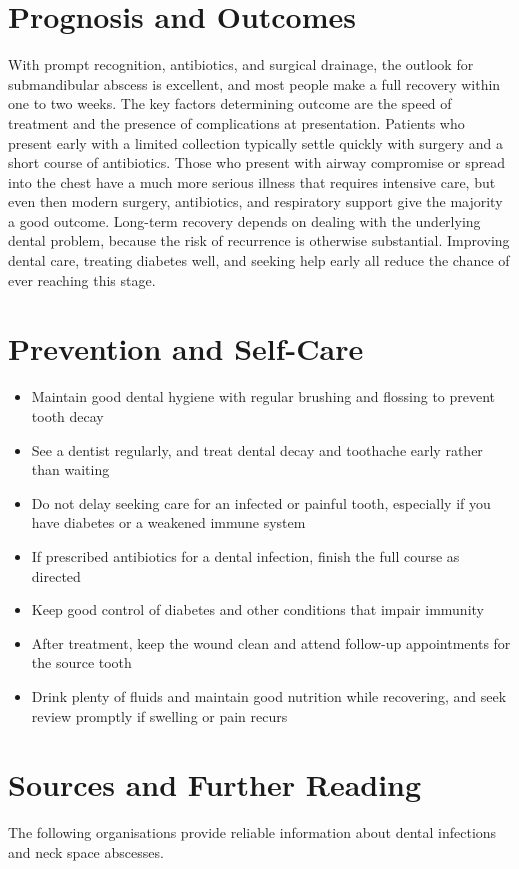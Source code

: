 \section*{Prognosis and Outcomes}
With prompt recognition, antibiotics, and surgical drainage, the outlook for submandibular abscess is excellent, and most people make a full recovery within one to two weeks. The key factors determining outcome are the speed of treatment and the presence of complications at presentation. Patients who present early with a limited collection typically settle quickly with surgery and a short course of antibiotics. Those who present with airway compromise or spread into the chest have a much more serious illness that requires intensive care, but even then modern surgery, antibiotics, and respiratory support give the majority a good outcome. Long-term recovery depends on dealing with the underlying dental problem, because the risk of recurrence is otherwise substantial. Improving dental care, treating diabetes well, and seeking help early all reduce the chance of ever reaching this stage.

\section*{Prevention and Self-Care}
\begin{itemize}
    \item Maintain good dental hygiene with regular brushing and flossing to prevent tooth decay
    \item See a dentist regularly, and treat dental decay and toothache early rather than waiting
    \item Do not delay seeking care for an infected or painful tooth, especially if you have diabetes or a weakened immune system
    \item If prescribed antibiotics for a dental infection, finish the full course as directed
    \item Keep good control of diabetes and other conditions that impair immunity
    \item After treatment, keep the wound clean and attend follow-up appointments for the source tooth
    \item Drink plenty of fluids and maintain good nutrition while recovering, and seek review promptly if swelling or pain recurs
\end{itemize}

\section*{Sources and Further Reading}
The following organisations provide reliable information about dental infections and neck space abscesses.

